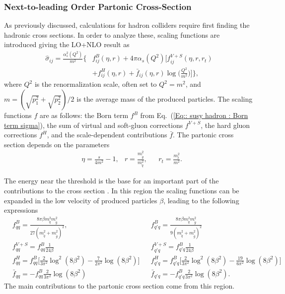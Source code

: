 \documentclass[twoside,english]{uiofysmaster}
\begin{document}
\subsubsection{Next-to-leading Order Partonic Cross-Section}

As previously discussed, calculations for hadron colliders require first finding the hadronic cross sections. In order to analyze these, scaling functions are introduced \cite{beenakker1997squark} giving the LO+NLO result as
\begin{align}\label{Eq:: susy hadron : Partonic cross section LO+NLO}
\hat{\sigma}_{ij} = \frac{\alpha_s^2(Q^2)}{m^2} \Big\{ &f^B_{ij}(\eta, r) + 4 \pi \alpha_s (Q^2) \Bigg[ f_{ij}^{V+S}(\eta, r, r_t) \nonumber \\ & + f_{ij}^H (\eta, r) + \bar{f}_{ij} (\eta, r) \log \Bigg( \frac{Q^2}{m^2}\Bigg) \Bigg] \Big\},
\end{align}
where $Q^2$ is the renormalization scale, often set to $Q^2 = m^2$, and $m = (\sqrt{p_1^2} + \sqrt{p_2^2})/2$ is the average mass of the produced particles. The scaling functions $f$ are as follows: the Born term $f^B$ from Eq.~(\ref{Eq:: susy hadron : Born term sigma}), the sum of virtual and soft-gluon corrections $f^{V+S}$, the hard gluon corrections $f^H$, and the scale-dependent contributions $\bar{f}$. The partonic cross section depends on the parameters
\begin{align}
&\eta = \frac{s}{4m^2} -1, &r= \frac{m_{\tilde{g}}^2}{m_{\tilde{q}}^2}, &&r_t = \frac{m_t^2}{m^2}.
\end{align}

The energy near the threshold is the base for an important part of the contributions to the cross section \cite{beenakker1997squark}. In this region the scaling functions can be expanded in the low velocity of produced particles $\beta$, leading to the following expressions \cite{beenakker1997squark}
\begin{align}
&f_{qq}^B = \frac{8 \pi \beta m_{\tilde{q}}^2 m_{\tilde{g}}^2}{27(m_{\tilde{q}}^2 + m_{\tilde{g}}^2)^2}, &&f_{q'q}^B = \frac{8 \pi \beta m_{\tilde{q}}^2 m_{\tilde{g}}^2}{9(m_{\tilde{q}}^2 + m_{\tilde{g}}^2)^2} \nonumber \\
& f_{qq}^{V+S} = f_{qq}^B \frac{1}{24 \beta} && f_{q'q}^{V+S} = f_{q'q}^B \frac{1}{24 \beta} \nonumber \\
&f_{qq}^H = f_{qq}^B \Big[\frac{2}{3 \pi^2} \log^2(8 \beta^2) - \frac{7}{2 \pi^2} \log (8 \beta^2) \Big] &&f_{q'q}^H = f_{q'q}^B \Big[\frac{2}{3 \pi^2} \log^2(8 \beta^2) - \frac{19}{6 \pi^2} \log (8 \beta^2) \Big] \nonumber \\
& \bar{f}_{qq} = - f_{qq}^B \frac{2}{3 \pi^2} \log (8 \beta^2) &&\bar{f}_{q'q} = - f_{q'q}^B \frac{2}{3 \pi^2} \log (8 \beta^2).\label{Eq:: susy hadron : Scaling functions near threshold}
\end{align}
The main contributions to the partonic cross section come from this region.
\end{document}
